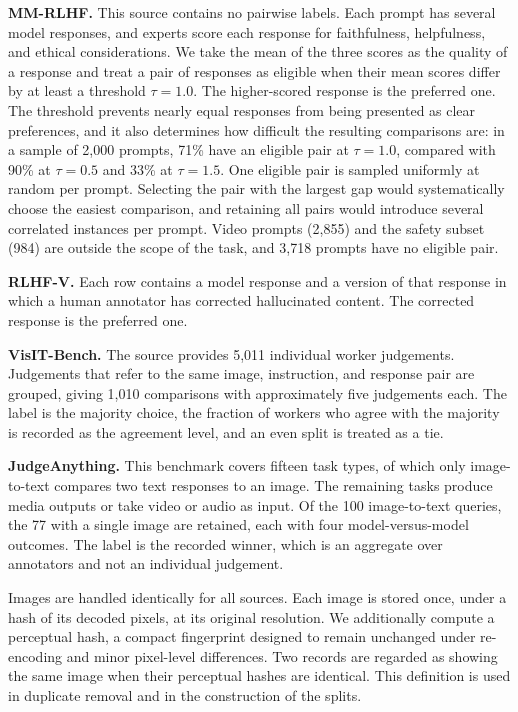 \documentclass[11pt]{article}
\begin{document}
\textbf{MM-RLHF.} This source contains no pairwise labels. Each prompt has several model responses, and experts score each response for faithfulness, helpfulness, and ethical considerations. We take the mean of the three scores as the quality of a response and treat a pair of responses as eligible when their mean scores differ by at least a threshold $\tau = 1.0$. The higher-scored response is the preferred one. The threshold prevents nearly equal responses from being presented as clear preferences, and it also determines how difficult the resulting comparisons are: in a sample of 2,000 prompts, 71\% have an eligible pair at $\tau = 1.0$, compared with 90\% at $\tau = 0.5$ and 33\% at $\tau = 1.5$. One eligible pair is sampled uniformly at random per prompt. Selecting the pair with the largest gap would systematically choose the easiest comparison, and retaining all pairs would introduce several correlated instances per prompt. Video prompts (2,855) and the safety subset (984) are outside the scope of the task, and 3,718 prompts have no eligible pair.
\citep{zhang2025mmrlhf}

\textbf{RLHF-V.} Each row contains a model response and a version of that response in which a human annotator has corrected hallucinated content. The corrected response is the preferred one.
\citep{yu2024rlhfv}

\textbf{VisIT-Bench.} The source provides 5,011 individual worker judgements. Judgements that refer to the same image, instruction, and response pair are grouped, giving 1,010 comparisons with approximately five judgements each. The label is the majority choice, the fraction of workers who agree with the majority is recorded as the agreement level, and an even split is treated as a tie.
\citep{bitton2023visitbench}

\textbf{JudgeAnything.} This benchmark covers fifteen task types, of which only image-to-text compares two text responses to an image. The remaining tasks produce media outputs or take video or audio as input. Of the 100 image-to-text queries, the 77 with a single image are retained, each with four model-versus-model outcomes. The label is the recorded winner, which is an aggregate over annotators and not an individual judgement.
\citep{pu2025judgeanything}

Images are handled identically for all sources. Each image is stored once, under a hash of its decoded pixels, at its original resolution. We additionally compute a perceptual hash, a compact fingerprint designed to remain unchanged under re-encoding and minor pixel-level differences. Two records are regarded as showing the same image when their perceptual hashes are identical. This definition is used in duplicate removal and in the construction of the splits.
\end{document}
